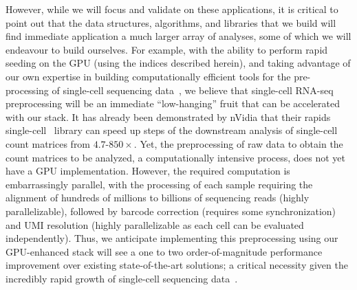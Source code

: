 However, while we will focus and validate on these applications, it is critical to point out that the data structures, algorithms, and libraries that we build will find immediate application a much larger array of analyses, some of which we will endeavour to build ourselves. For example, with the ability to perform rapid seeding on the GPU (using the indices described herein), and taking advantage of our own expertise in building computationally efficient tools for the pre-processing of single-cell sequencing data~\cite{he2022alevin}, we believe that single-cell RNA-seq preprocessing will be an immediate ``low-hanging'' fruit that can be accelerated with our stack. It has already been demonstrated by nVidia that their rapids single-cell~\cite{rapids} library can speed up steps of the downstream analysis of single-cell count matrices from $4.7$-$850\times$. Yet, the preprocessing of raw data to obtain the count matrices to be analyzed, a computationally intensive process, does not yet have a GPU implementation. However, the required computation is embarrassingly parallel, with the processing of each sample requiring the alignment of hundreds of millions to billions of sequencing reads (highly parallelizable), followed by barcode correction (requires some synchronization) and UMI resolution (highly parallelizable as each cell can be evaluated independently). Thus, we anticipate implementing this preprocessing using our GPU-enhanced stack will see a one to two order-of-magnitude performance improvement over existing state-of-the-art solutions; a critical necessity given the incredibly rapid growth of single-cell sequencing data~\cite{scgrowth2022}.



